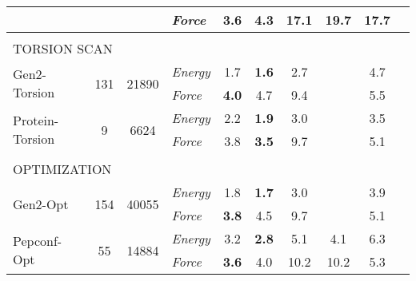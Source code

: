 \documentclass[varwidth]{standalone}
\newcommand{\widthbetweentype}{7pt}
\begin{document}
\begin{adjustbox}{width=\textwidth,center}
\begin{tabular}{l c c l c c c c c c}
                                   &                       &                         & \textit{Force}  & \textbf{3.6} & 4.3 & 17.1 & 19.7 & 17.7\\
\hline
\multicolumn{8}{l}{\vspace{\widthbetweentype}} \\[-1em]
\multicolumn{8}{l}{\small{TORSION SCAN}} \\\hline
\multirow{2}{*}{Gen2-Torsion} & \multirow{2}{*}{131} & \multirow{2}{*}{21890} & \textit{Energy} & 1.7 & \textbf{1.6} & 2.7 &  & 4.7\\
                                   &                       &                         & \textit{Force}  & \textbf{4.0} & 4.7 & 9.4 &  & 5.5\\
\hline
\multirow{2}{*}{Protein-Torsion} & \multirow{2}{*}{9} & \multirow{2}{*}{6624} & \textit{Energy} & 2.2 & \textbf{1.9} & 3.0 &  & 3.5\\
                                   &                       &                         & \textit{Force}  & 3.8 & \textbf{3.5} & 9.7 &  & 5.1\\
\hline
\multicolumn{8}{l}{\vspace{\widthbetweentype}} \\[-1em]
\multicolumn{8}{l}{\small{OPTIMIZATION}} \\\hline
\multirow{2}{*}{Gen2-Opt} & \multirow{2}{*}{154} & \multirow{2}{*}{40055} & \textit{Energy} & 1.8 & \textbf{1.7} & 3.0 &  & 3.9\\
                                   &                       &                         & \textit{Force}  & \textbf{3.8} & 4.5 & 9.7 &  & 5.1\\
\hline
\multirow{2}{*}{Pepconf-Opt} & \multirow{2}{*}{55} & \multirow{2}{*}{14884} & \textit{Energy} & 3.2 & \textbf{2.8} & 5.1 & 4.1 & 6.3\\
                                   &                       &                         & \textit{Force}  & \textbf{3.6} & 4.0 & 10.2 & 10.2 & 5.3\\
\hline
\hline
\hline
\end{tabular}


\end{adjustbox}
\end{document}
